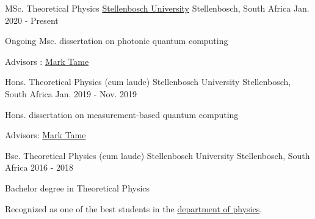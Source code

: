 

\begin{cventries}

  \cventry
    {MSc. Theoretical Physics} %
    {\href{http://www.sun.ac.za/english}{Stellenbosch University}} %
    {Stellenbosch, South Africa} %
    {Jan. 2020 - Present} %
    {
      \begin{cvitems} %
        \item {Ongoing Msc. dissertation on photonic quantum computing}
        \item {Advisors : \href{http://quantumnanophotonics.org/}{Mark Tame}}
      \end{cvitems}
    }

  \cventry
    {Hons. Theoretical Physics (cum laude)} %
    {Stellenbosch University} %
    {Stellenbosch, South Africa} %
    {Jan. 2019 - Nov. 2019} %
    {
      \begin{cvitems} %
        \item {Hons. dissertation on measurement-based quantum computing}
        \item {Advisors: \href{http://quantumnanophotonics.org/}{Mark Tame}}
      \end{cvitems}
    }


  \cventry
    {Bsc. Theoretical Physics (cum laude)} %
    {Stellenbosch University} %
    {Stellenbosch, South Africa} %
    {2016 - 2018} %
    {
      \begin{cvitems} %
        \item {Bachelor degree in Theoretical Physics}
        \item {Recognized as one of the best students in the
                \href{http://www.sun.ac.za/english/faculty/science/physics}{department of
            physics}.}
      \end{cvitems}
    }


\end{cventries}

